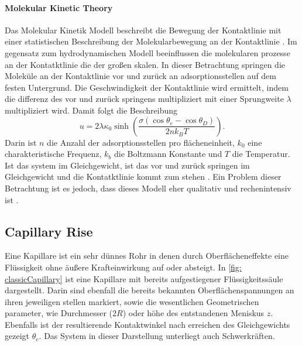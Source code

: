 \paragraph{Molekular Kinetic Theory}
Das Molekular Kinetik Modell beschreibt die Bewegung der Kontaktlinie mit einer statistischen Beschreibung der Molekularbewegung an der Kontaktlinie \cite{blake1969KineticsDisplacement}. 
Im gegensatz zum hydrodynamischen Modell beeinflussen die molekularen prozesse an der Kontatktlinie die der großen skalen. In dieser Betrachtung springen die Moleküle an der Kontaktlinie vor und zurück an adsorptionsstellen auf dem festen Untergrund. Die Geschwindigkeit der Kontaktlinie wird ermittelt, indem die differenz des vor und zurück springens multipliziert mit einer Sprungweite $\lambda$ multipliziert wird. Damit folgt die Beschreibung
\begin{equation}
    u=2\lambda\kappa_{0}\sinh\left(\frac{\sigma\left(\cos\theta_{e}-\cos\theta_{D}\right)}{2nk_{B}T}\right).
\end{equation}
Darin ist $n$ die Anzahl der adsorptionsstellen pro flächeneinheit, $k_0$ eine charakteristische Frequenz, $k_b$ die Boltzmann Konstante und $T$ die Temperatur.
Ist das system im Gleichgewicht, ist das vor und zurück springen im Gleichgewicht und die Kontatktlinie kommt zum stehen \cite{carlson2011DissipationRapidDynamic,blake2006PhysicsMovingWetting}. Ein Problem dieser Betrachtung ist es jedoch, dass dieses Modell eher qualitativ und rechenintensiv ist \cite{mohammadkarim2022ReviewPhysicsMoving}.







\subsection{Capillary Rise}
Eine Kapillare ist ein sehr dünnes Rohr in denen durch Oberflächeneffekte eine Flüssigkeit ohne äußere Krafteinwirkung auf oder absteigt. In \ref{fig: classicCapillary} ist eine Kapillare mit bereits aufgestiegener Flüssigkeitssäule dargestellt. Darin sind ebenfall die bereits bekannten Oberflächenspannungen an ihren jeweiligen stellen markiert, sowie die wesentlichen Geometrischen parameter, wie Durchmesser ($2R$) oder höhe des entstandenen Meniskus $z$. Ebenfalls ist der resultierende Kontaktwinkel nach erreichen des Gleichgewichts gezeigt $\theta_e$. Das System in dieser Darstellung unterliegt auch Schwerkräften. 

